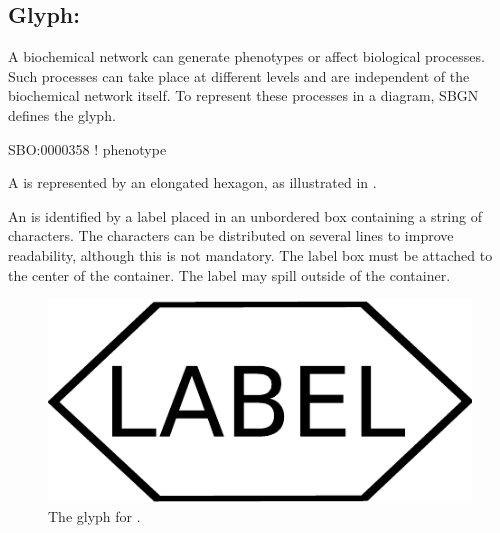 \subsection{Glyph: }
\label{sec:af:phenotype}

A biochemical network can generate phenotypes or affect biological processes. Such processes can take place at different levels and are independent of the biochemical network itself. To represent these processes in a diagram, SBGN defines the  glyph.

\begin{glyphDescription}

\glyphSboTerm
SBO:0000358 ! phenotype

\glyphContainer A  is represented by an elongated
hexagon, as illustrated in .

\glyphLabel An  is identified by a label placed in an
unbordered box containing a string of characters.  The characters can be
distributed on several lines to improve readability, although this is not
mandatory.  The label box must be attached to the center of the
 container.  The label may spill outside of the container.

\end{glyphDescription}

\begin{figure}[H]
  \centering
  \includegraphics[scale = 0.4]{images/phenotype}
  \caption{The \AF glyph for .}
  \label{fig:af:phenotype}
\end{figure}
